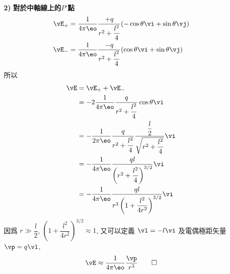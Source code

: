 \begin{solve}
\begin{itemize}
        \item[\textbf{2)}]\textbf{對於中軸線上的$P'$點}
              \begin{align*}
                  \vE_+ & = \frac{1}{4\pi\eo}\frac{+q}{r^2 + \dfrac{l^2}{4}}(-\cos \theta \vi + \sin \theta \vj) \\
                  \vE_- & = \frac{1}{4\pi\eo}\frac{-q}{r^2 + \dfrac{l^2}{4}}(\cos \theta \vi + \sin \theta \vj)
              \end{align*}
              所以
              \begin{align*}
                  \vE & = \vE_{+} + \vE_{-}                                                                                    \\
                      & = -2\frac{1}{4\pi\eo}\frac{q}{r^2 + \dfrac{l^2}{4}}\cos\theta \vi                                      \\
                      & = -\frac{1}{2\pi\eo}\frac{q}{r^2 + \dfrac{l^2}{4}}\frac{\dfrac{l}{2}}{\sqrt{r^2 + \dfrac{l^2}{4}}} \vi \\
                      & = -\frac{1}{4\pi\eo}\frac{ql}{\left(r^2 + \dfrac{l^2}{4}\right)^{3/2}} \vi                             \\
                      & = -\frac{1}{4\pi\eo}\frac{ql}{r^3\left(1 + \dfrac{l^2}{4r^2}\right)^{3/2}} \vi
              \end{align*}
              因爲 $r \gg \dfrac{l}{2}$, $\left(1 + \dfrac{l^2}{4r^2}\right)^{3/2} \approx 1$, 又可以定義 $\vl = -l\vi$ 及電偶極距矢量 $\vp = q\vl$,
              \begin{equation*}
                  \vE \approx \frac{1}{4\pi\eo}\frac{\vp}{r^3} \qedhere
              \end{equation*}
    \end{itemize}
\end{solve}